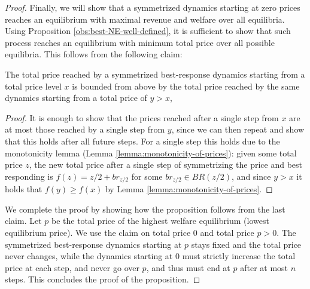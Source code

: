 \begin{proof}
Finally, we will show that a symmetrized dynamics starting at zero prices reaches an equilibrium with maximal revenue and welfare over all equilibria.
Using Proposition \ref{obs:best-NE-well-defined}, it is sufficient to show that such process reaches an equilibrium with minimum total price over all possible equilibria. This follows from the following claim:

\begin{claim}
The total price reached by a symmetrized best-response dynamics starting from a total price level $x$ is bounded from above by the total price reached by the same dynamics starting from a total price of $y>x$,
%
\end{claim}
\begin{proof}
It is enough to show that the prices reached after a single step from $x$ are at most those reached by a single step from $y$, since we can then repeat and show that this holds after all future steps.  For a single step this holds due to the monotonicity lemma (Lemma \ref{lemma:monotonicity-of-prices}): given some total price $z$, the new total price after a single step of symmetrizing the price and best responding is $f(z)=z/2+br_{z/2}$ for some $br_{z/2}\in BR(z/2)$, and since $y>x$ it holds that $f(y)\geq f(x)$ by Lemma \ref{lemma:monotonicity-of-prices}.
\end{proof}

We complete the proof by showing how the proposition follows from the last claim. Let $p$ be the total price of the highest welfare equilibrium (lowest equilibrium price).
We use the claim on total price $0$ and total price $p>0$. The symmetrized best-response dynamics starting at $p$ stays fixed and the total price never changes, while the dynamics starting at $0$ must strictly increase the total price at each step, and never go over $p$, and thus must end at $p$ after at most $n$ steps.
This concludes the proof of the proposition.
\end{proof}

